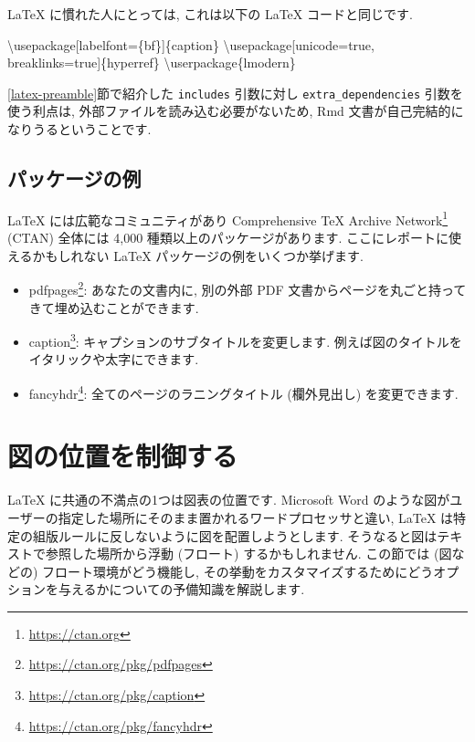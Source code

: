 \documentclass[
  11pt,
]{bxjsreport}
\newenvironment{Shaded}{\begin{snugshade}}{\end{snugshade}}
\newcommand{\BuiltInTok}[1]{#1}
\newcommand{\ExtensionTok}[1]{#1}
\newcommand{\FunctionTok}[1]{\textcolor[rgb]{0.00,0.00,0.00}{#1}}
\newcommand{\NormalTok}[1]{#1}
\providecommand{\tightlist}{%
  \setlength{\itemsep}{0pt}\setlength{\parskip}{0pt}}
\renewcommand{\href}[2]{#2\footnote{\url{#1}}}
\begin{document}
LaTeX に慣れた人にとっては, これは以下の LaTeX コードと同じです.

\begin{Shaded}
\begin{Highlighting}[]
\BuiltInTok{\textbackslash{}usepackage}\NormalTok{[labelfont=\{bf\}]\{}\ExtensionTok{caption}\NormalTok{\} }
\BuiltInTok{\textbackslash{}usepackage}\NormalTok{[unicode=true, breaklinks=true]\{}\ExtensionTok{hyperref}\NormalTok{\}}
\FunctionTok{\textbackslash{}userpackage}\NormalTok{\{lmodern\}}
\end{Highlighting}
\end{Shaded}

\ref{latex-preamble}節で紹介した \texttt{includes} 引数に対し \texttt{extra\_dependencies} 引数を使う利点は, 外部ファイルを読み込む必要がないため, Rmd 文書が自己完結的になりうるということです.

\hypertarget{example-packages}{%
\subsection{パッケージの例}\label{example-packages}}

LaTeX には広範なコミュニティがあり \href{https://ctan.org}{Comprehensive TeX Archive Network} (CTAN) 全体には 4,000 種類以上のパッケージがあります. ここにレポートに使えるかもしれない LaTeX パッケージの例をいくつか挙げます.

\begin{itemize}
\tightlist
\item
  \href{https://ctan.org/pkg/pdfpages}{pdfpages}: あなたの文書内に, 別の外部 PDF 文書からページを丸ごと持ってきて埋め込むことができます.
\item
  \href{https://ctan.org/pkg/caption}{caption}: キャプションのサブタイトルを変更します. 例えば図のタイトルをイタリックや太字にできます.
\item
  \href{https://ctan.org/pkg/fancyhdr}{fancyhdr}: 全てのページのラニングタイトル (欄外見出し) を変更できます.
\end{itemize}

\hypertarget{figure-placement}{%
\section{図の位置を制御する}\label{figure-placement}}

LaTeX に共通の不満点の1つは図表の位置です. Microsoft Word のような図がユーザーの指定した場所にそのまま置かれるワードプロセッサと違い, LaTeX は特定の組版ルールに反しないように図を配置しようとします. そうなると図はテキストで参照した場所から浮動 (フロート) するかもしれません. この節では (図などの) フロート環境がどう機能し, その挙動をカスタマイズするためにどうオプションを与えるかについての予備知識を解説します.
\end{document}
